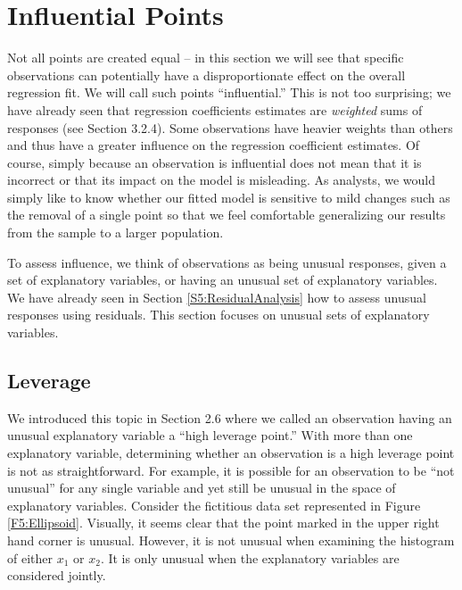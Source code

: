 \linejed

\section{Influential Points}

Not all points are created equal -- in this section we will see that
specific observations can potentially have a disproportionate effect
on the overall regression fit. We will call such points
``influential.'' This is not too surprising; we have already seen
that regression coefficients estimates are \emph{weighted} sums of
responses (see Section 3.2.4). Some observations have heavier
weights than others and thus have a greater influence on the
regression coefficient estimates. Of course, simply because an
observation is influential does not mean that it is incorrect or
that its impact on the model is misleading. As analysts, we would
simply like to know whether our fitted model is sensitive to mild
changes such as the removal of a single point so that we feel
comfortable generalizing our results from the sample to a larger
population.

To assess influence, we think of observations as being unusual
responses, given a set of explanatory variables, or having an
unusual set of explanatory variables. We have already seen in
Section \ref{S5:ResidualAnalysis} how to assess unusual responses
using residuals. This section focuses on unusual sets of explanatory
variables.


\subsection{Leverage}\label{S5:Leverage}

We introduced this topic in Section 2.6 where we called an
observation having an unusual explanatory variable a ``high leverage
point.'' With more than one explanatory variable, determining
whether an observation is a high leverage point is not as
straightforward. For example, it is possible for an observation to
be ``not unusual'' for any single variable and yet still be unusual
in the space of explanatory variables. Consider the fictitious data
set represented in Figure \ref{F5:Ellipsoid}. Visually, it seems
clear that the point marked in the upper right hand corner is
unusual. However, it is not unusual when examining the histogram of
either $x_1$ or $x_2$. It is only unusual when the explanatory
variables are considered jointly.



